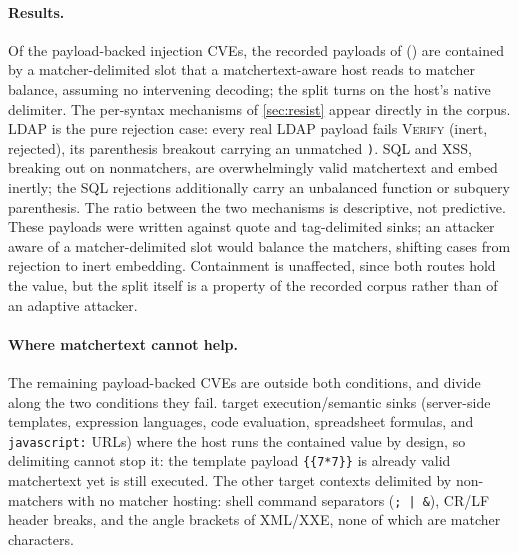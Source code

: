 \paragraph{Results.}
Of the \dataPayloadBackedCVEs payload-backed injection CVEs, the recorded payloads of
\textbf{\dataContained} (\textbf{\dataContainedShare}) are contained by a matcher-delimited slot that a
matchertext-aware host reads to matcher balance, assuming no intervening
decoding; the split turns on the host's native delimiter.
The per-syntax mechanisms of \cref{sec:resist} appear directly in the corpus.
LDAP is the pure rejection case: every real LDAP payload fails \textsc{Verify}
(\dataLdapInert inert, \dataLdapRejected rejected), its parenthesis breakout carrying an unmatched \verb|)|.
SQL and XSS, breaking out on nonmatchers, are overwhelmingly valid matchertext
and embed inertly; the \dataSqlRejected SQL rejections additionally carry an unbalanced
function or subquery parenthesis.
The ratio between the two mechanisms is descriptive, not predictive.
These payloads were written against quote and tag-delimited sinks; an attacker
aware of a matcher-delimited slot would balance the matchers, shifting cases
from rejection to inert embedding.
Containment is unaffected, since both routes hold the value, but the split
itself is a property of the recorded corpus rather than of an adaptive attacker.

\paragraph{Where matchertext cannot help.}
The remaining \dataOutsideCVEs payload-backed CVEs are outside both conditions, and divide
along the two conditions they fail.
\dataOutsideSemantic target execution/semantic sinks (server-side templates, expression
languages, code evaluation, spreadsheet formulas, and \verb|javascript:| URLs)
where the host runs the contained value by design, so delimiting cannot stop
it: the template payload \verb|{{7*7}}| is already valid matchertext yet is
still executed.
The other \dataOutsideNonmatcher target contexts delimited by non-matchers with no matcher hosting:
shell command separators (\verb|;|~\verb-|-~\verb|&|), CR/LF header breaks, and
the angle brackets of XML/XXE, none of which are matcher characters.

